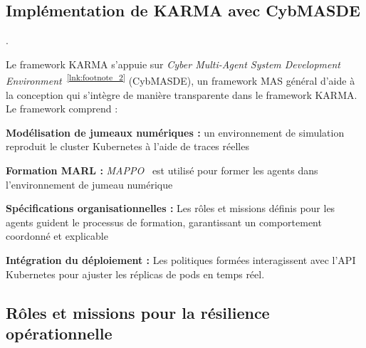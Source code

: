 \subsection{Implémentation de KARMA avec CybMASDE}


.

Le framework KARMA s'appuie sur \textit{Cyber Multi-Agent System Development Environment}~\textsuperscript{\ref{lnk:footnote_2}} (CybMASDE), un framework MAS général d'aide à la conception qui s'intègre de manière transparente dans le framework KARMA.
Le framework comprend :
\begin{enumerate*}[label=\textbf{\arabic*)}, itemjoin={;\quad }]
    \item \textbf{Modélisation de jumeaux numériques :} un environnement de simulation reproduit le cluster Kubernetes à l'aide de traces réelles
    \item \textbf{Formation MARL :} \textit{MAPPO}~\cite{Yu2022} est utilisé pour former les agents dans l'environnement de jumeau numérique
    \item \textbf{Spécifications organisationnelles :} Les rôles et missions définis pour les agents guident le processus de formation, garantissant un comportement coordonné et explicable
    \item \textbf{Intégration du déploiement :} Les politiques formées interagissent avec l'API Kubernetes pour ajuster les réplicas de pods en temps réel.
\end{enumerate*}

\subsection{Rôles et missions pour la résilience opérationnelle}

